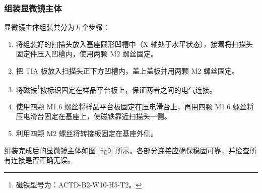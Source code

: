 \documentclass{article}
\begin{document}
\begin{spacing}{1.5}
	
	
	
	
	\subsubsection{组装显微镜主体}
	显微镜主体组装共分为五个步骤：
	\begin{enumerate}
		\item 将组装好的扫描头放入基座圆形凹槽中（X 轴处于水平状态），接着将扫描头固定件压入凹槽内，使用两颗 M2 螺丝固定。
		\item 把 TIA 板放入扫描头正下方凹槽内，盖上盖板并用两颗 M2 螺丝固定。
		\item 将磁铁\footnote{磁铁型号为：ACTD-B2-W10-H5-T2。}按标识固定在样品平台板上，保证两者之间的电气连接。
		\item 使用四颗 M1.6 螺丝将样品平台板固定在压电滑台上，再用四颗 M1.6 螺丝将压电滑台固定在基座上，使磁铁靠近扫描头一侧。
		\item 利用四颗 M2 螺丝将转接板固定在基座外侧。
	\end{enumerate}
	组装完成后的显微镜主体如图 \ref{fig9} 所示。各部分连接应确保稳固可靠，并检查所有连接是否正确无误。
	\begin{figure}[htbp]
		\centering
		\hfill
		\begin{subfigure}{0.4\textwidth}
			\centering
\end{subfigure}
\end{figure}
\end{spacing}
\end{document}
